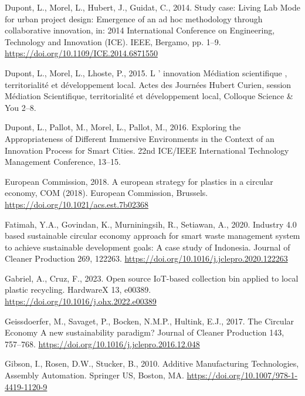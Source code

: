 \documentclass[
  11pt,
]{article}
\newlength{\cslhangindent}
\newlength{\cslentryspacingunit} %
\newenvironment{CSLReferences}[2] %
 {%
  \setlength{\parindent}{0pt}
  \ifodd #1
  \let\oldpar\par
  \def\par{\hangindent=\cslhangindent\oldpar}
  \fi
  \setlength{\parskip}{#2\cslentryspacingunit}
 }%
 {}
\begin{document}
\begin{CSLReferences}{1}{0}
\leavevmode{}%
Dupont, L., Morel, L., Hubert, J., Guidat, C., 2014. Study case: {Living
Lab Mode} for urban project design: {Emergence} of an ad hoc methodology
through collaborative innovation, in: 2014 {International Conference} on
{Engineering}, {Technology} and {Innovation} ({ICE}). {IEEE}, {Bergamo},
pp. 1--9. \url{https://doi.org/10.1109/ICE.2014.6871550}

\leavevmode{}%
Dupont, L., Morel, L., Lhoste, P., 2015. L ' innovation {Médiation}
scientifique , territorialité et développement local. Actes des Journées
Hubert Curien, session Médiation Scientifique, territorialité et
développement local, Colloque Science \& You 2--8.

\leavevmode{}%
Dupont, L., Pallot, M., Morel, L., Pallot, M., 2016. Exploring the
{Appropriateness} of {Different Immersive Environments} in the {Context}
of an {Innovation Process} for {Smart Cities}. 22nd ICE/IEEE
International Technology Management Conference, 13--15.

\leavevmode{}%
European Commission, 2018. A european strategy for plastics in a
circular economy, COM (2018). {European Commission}, {Brussels}.
\url{https://doi.org/10.1021/acs.est.7b02368}

\leavevmode{}%
Fatimah, Y.A., Govindan, K., Murniningsih, R., Setiawan, A., 2020.
Industry 4.0 based sustainable circular economy approach for smart waste
management system to achieve sustainable development goals: {A} case
study of {Indonesia}. Journal of Cleaner Production 269, 122263.
\url{https://doi.org/10.1016/j.jclepro.2020.122263}

\leavevmode{}%
Gabriel, A., Cruz, F., 2023. Open source {IoT-based} collection bin
applied to local plastic recycling. HardwareX 13, e00389.
\url{https://doi.org/10.1016/j.ohx.2022.e00389}

\leavevmode{}%
Geissdoerfer, M., Savaget, P., Bocken, N.M.P., Hultink, E.J., 2017. The
{Circular Economy} \textendash{} {A} new sustainability paradigm?
Journal of Cleaner Production 143, 757--768.
\url{https://doi.org/10.1016/j.jclepro.2016.12.048}

\leavevmode{}%
Gibson, I., Rosen, D.W., Stucker, B., 2010. Additive {Manufacturing
Technologies}, Assembly Automation. {Springer US}, {Boston, MA}.
\url{https://doi.org/10.1007/978-1-4419-1120-9}


\end{CSLReferences}
\end{document}
